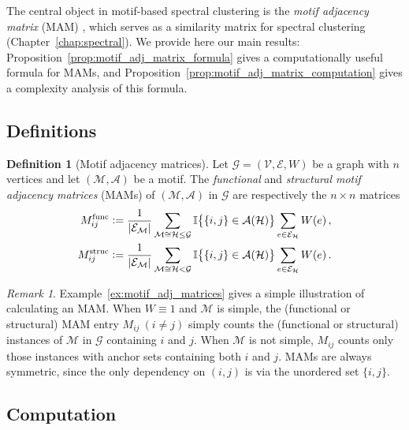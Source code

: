 \documentclass[12pt,draft]{ociamthesis}
\theoremstyle{plain}
\theoremstyle{definition}
\newtheorem{definition}{Definition}[chapter]
\theoremstyle{remark}
\newtheorem*{remark}{Remark}
\newcommand\bb[1]{\mathbb{#1}}
\newcommand\ca[1]{\mathcal{#1}}
\begin{document}
The central object in motif-based spectral clustering is the \emph{motif
adjacency matrix} (MAM) \cite{benson2016higher}, which serves as a similarity
matrix for spectral clustering (Chapter~\ref{chap:spectral}).
We provide here our main results:
Proposition~\ref{prop:motif_adj_matrix_formula} gives a computationally useful
formula for MAMs, and Proposition~\ref{prop:motif_adj_matrix_computation} gives
a complexity analysis of this formula.

\pagebreak

\subsection{Definitions}

\begin{definition}[Motif adjacency matrices] \label{def:motif_adj_matrices}
%
Let $\ca{G} = (\ca{V,E},W)$ be a graph with $n$ vertices and let $\ca{(M,A)}$
be a motif. The \emph{functional} and \emph{structural motif adjacency
matrices} (MAMs) of $\ca{(M,A)}$ in $\ca{G}$ are respectively the $n \times
n$ matrices
%
\begin{align*}
M^\mathrm{func}_{i j} &\vcentcolon= \frac{1}{|\ca{E_M}|} \sum_{\ca{M} \cong
\ca{H} \leq \ca{G}} \bb{I} \big\{ \{i,j\} \in \ca{A}(\ca{H}) \big\} \sum_{e
\in \ca{E_H}} W(e)\,, \\
M^\mathrm{struc}_{i j} &\vcentcolon= \frac{1}{|\ca{E_M}|} \sum_{\ca{M} \cong
\ca{H} < \ca{G}} \bb{I} \big\{ \{i,j\} \in \ca{A}(\ca{H}) \big\} \sum_{e
\in \ca{E_H}} W(e)\,.
\end{align*}
\end{definition}

\begin{remark}
Example~\ref{ex:motif_adj_matrices} gives a simple illustration of
calculating an MAM.
When $W \equiv 1$ and $\ca{M}$ is simple, the (functional or structural) MAM
entry $M_{i j} \ (i \neq j)$ simply counts the (functional or structural)
instances of $\ca{M}$ in $\ca{G}$ containing $i$ and $j$.
When $\ca{M}$ is not simple, $M_{i j}$ counts only those instances with anchor
sets containing both $i$ and $j$.
MAMs are always symmetric, since the only dependency on $(i,j)$ is via the
unordered set $\{i,j\}$.
\end{remark}

\subsection{Computation} \label{sec:graphs_computation}
\end{document}
